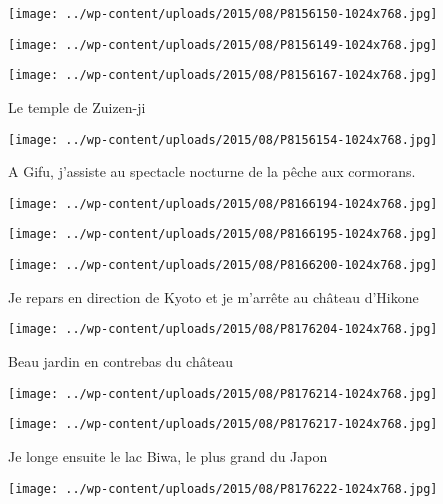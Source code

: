  \newline
\centerline{\texttt{[image: ../wp-content/uploads/2015/08/P8156150-1024x768.jpg]} } 
 \newline
 \newline
\centerline{\texttt{[image: ../wp-content/uploads/2015/08/P8156149-1024x768.jpg]} } 
 \newline
 \newline
\centerline{\texttt{[image: ../wp-content/uploads/2015/08/P8156167-1024x768.jpg]} } 
 \newline
 Le temple de Zuizen-ji \newline
 \newline
\centerline{\texttt{[image: ../wp-content/uploads/2015/08/P8156154-1024x768.jpg]} } 
 \newline
 A Gifu, j'assiste au spectacle nocturne de la pêche aux cormorans. \newline
 \newline
\centerline{\texttt{[image: ../wp-content/uploads/2015/08/P8166194-1024x768.jpg]} } 
 \newline
 \newline
\centerline{\texttt{[image: ../wp-content/uploads/2015/08/P8166195-1024x768.jpg]} } 
 \newline
 \newline
\centerline{\texttt{[image: ../wp-content/uploads/2015/08/P8166200-1024x768.jpg]} } 
 \newline
 Je repars en direction de Kyoto et je m'arrête au château d'Hikone \newline
 \newline
\centerline{\texttt{[image: ../wp-content/uploads/2015/08/P8176204-1024x768.jpg]} } 
 \newline
 Beau jardin en contrebas du château \newline
 \newline
\centerline{\texttt{[image: ../wp-content/uploads/2015/08/P8176214-1024x768.jpg]} } 
 \newline
 \newline
\centerline{\texttt{[image: ../wp-content/uploads/2015/08/P8176217-1024x768.jpg]} } 
 \newline
 Je longe ensuite le lac Biwa, le plus grand du Japon \newline
 \newline
\centerline{\texttt{[image: ../wp-content/uploads/2015/08/P8176222-1024x768.jpg]} } 
